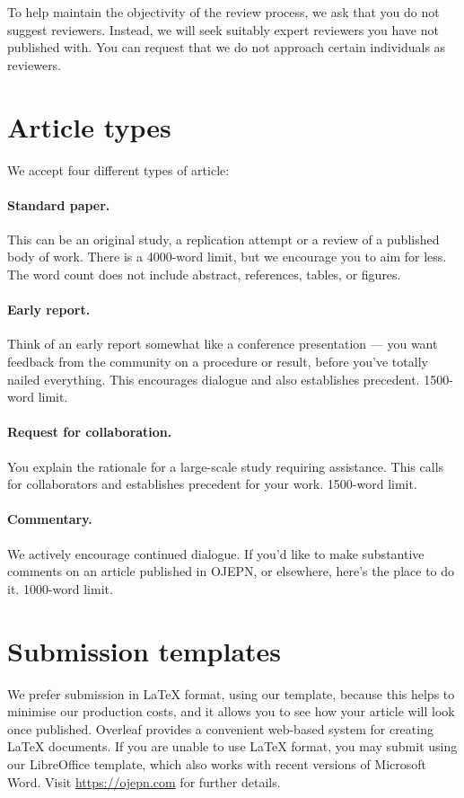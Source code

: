 \documentclass[twocolumn]{article}
\begin{document}
To help maintain the objectivity of the review process, we ask that you do not suggest reviewers. Instead, we will seek suitably expert reviewers you have not published with. You can request that we do not approach certain individuals as reviewers. 

\section{Article types}

We accept four different types of article:

\paragraph{Standard paper.} This can be an original study, a replication attempt or a review of a published body of work. There is a 4000-word limit, but we encourage you to aim for less. The word count does not include abstract, references, tables, or figures.

\paragraph{Early report.} Think of an early report somewhat like a conference presentation — you want feedback from the community on a procedure or result, before you’ve totally nailed everything. This encourages dialogue and also establishes precedent. 1500-word limit.

\paragraph{Request for collaboration.} You explain the rationale for a large-scale study requiring assistance. This calls for collaborators and establishes precedent for your work. 1500-word limit.

\paragraph{Commentary.} We actively encourage continued dialogue. If you'd like to make substantive comments on an article published in OJEPN, or elsewhere, here's the place to do it. 1000-word limit.


\section{Submission templates}

We prefer submission in LaTeX format, using our template, because this helps to minimise our production costs, and it allows you to see how your article will look once published. Overleaf provides a convenient web-based system for creating LaTeX documents. If you are unable to use LaTeX format, you may submit using our LibreOffice template, which also works with recent versions of Microsoft Word. Visit \url{https://ojepn.com} for further details.
\end{document}
